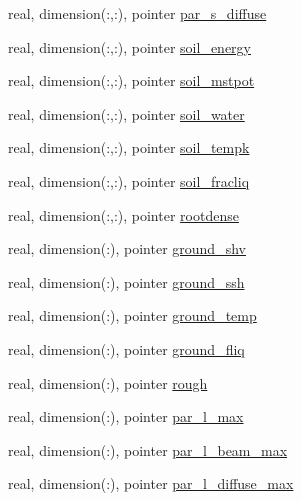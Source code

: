 \begin{DoxyCompactItemize}
\item 
real, dimension(\+:,\+:), pointer \hyperlink{structed__state__vars_1_1sitetype_a2644ff64523223cfc305a326d97332e2}{par\+\_\+s\+\_\+diffuse}
\item 
real, dimension(\+:,\+:), pointer \hyperlink{structed__state__vars_1_1sitetype_a025a5d4036b2fff9e3a80a7e214c48ab}{soil\+\_\+energy}
\item 
real, dimension(\+:,\+:), pointer \hyperlink{structed__state__vars_1_1sitetype_a4deefdb63634e4111505db97fdfc4bad}{soil\+\_\+mstpot}
\item 
real, dimension(\+:,\+:), pointer \hyperlink{structed__state__vars_1_1sitetype_aea18b1d599b8e55c4e22b16f360ae102}{soil\+\_\+water}
\item 
real, dimension(\+:,\+:), pointer \hyperlink{structed__state__vars_1_1sitetype_a4f3e0657e3b3f849bf1b1966d3d1c8ce}{soil\+\_\+tempk}
\item 
real, dimension(\+:,\+:), pointer \hyperlink{structed__state__vars_1_1sitetype_ab9d7eac1317cb5d5c2e4b485c73aefe2}{soil\+\_\+fracliq}
\item 
real, dimension(\+:,\+:), pointer \hyperlink{structed__state__vars_1_1sitetype_a7903aee63b08a2d05f8a8ba3528658bc}{rootdense}
\item 
real, dimension(\+:), pointer \hyperlink{structed__state__vars_1_1sitetype_a238358e25cc3c4b3d972d1e1986756b6}{ground\+\_\+shv}
\item 
real, dimension(\+:), pointer \hyperlink{structed__state__vars_1_1sitetype_a055717e328f8af66d1d2f1b2c5751bc3}{ground\+\_\+ssh}
\item 
real, dimension(\+:), pointer \hyperlink{structed__state__vars_1_1sitetype_ac3e1d61237661b7868a83a5425ac6fba}{ground\+\_\+temp}
\item 
real, dimension(\+:), pointer \hyperlink{structed__state__vars_1_1sitetype_a63a9a6bd6e18958f625999ab54b53cf9}{ground\+\_\+fliq}
\item 
real, dimension(\+:), pointer \hyperlink{structed__state__vars_1_1sitetype_a820d443eb59463ee3d2f8ec4dbc39912}{rough}
\item 
real, dimension(\+:), pointer \hyperlink{structed__state__vars_1_1sitetype_af3d19a1f56797a8e8f36ce4d930adcc5}{par\+\_\+l\+\_\+max}
\item 
real, dimension(\+:), pointer \hyperlink{structed__state__vars_1_1sitetype_ad4b618baadf66f43cac8e1c738f43b63}{par\+\_\+l\+\_\+beam\+\_\+max}
\item 
real, dimension(\+:), pointer \hyperlink{structed__state__vars_1_1sitetype_a6e40caee4f1eb9190a810169dd81047e}{par\+\_\+l\+\_\+diffuse\+\_\+max}

\end{DoxyCompactItemize}
